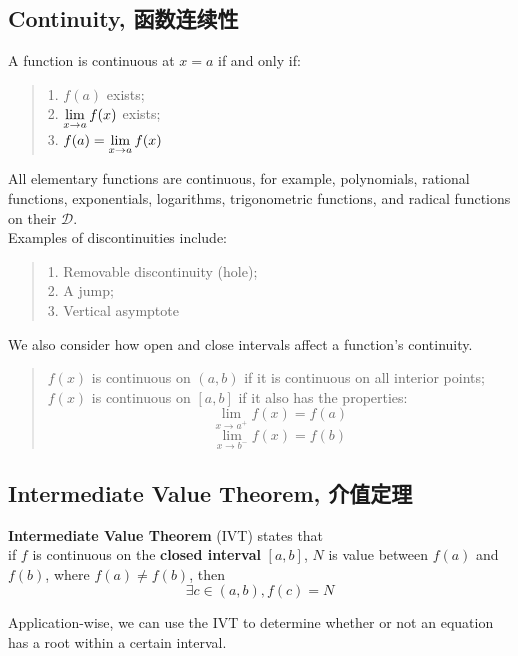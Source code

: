 \subsection{Continuity, 函数连续性}
A function is continuous at $x=a$ if and only if:
\begin{quote}
    1. $f(a)$ exists; \\
    2. $\displaystyle \lim_{x \to a} f(x)$ exists; \\
    3. $f(a) = \displaystyle \lim_{x \to a} f(x)$
\end{quote}
All elementary functions are continuous, for example, polynomials, rational functions, exponentials, logarithms, trigonometric functions, and radical functions on their $\mathscr{D}$. \\
Examples of discontinuities include:
\begin{quote}
    1. Removable discontinuity (hole); \\
    2. A jump; \\
    3. Vertical asymptote
\end{quote}
We also consider how open and close intervals affect a function's continuity.
\begin{quote}
    $f(x)$ is continuous on $(a, b)$ if it is continuous on all interior points; \\
    $f(x)$ is continuous on $[a, b]$ if it also has the properties:
    $$\lim_{x \to a^+} f(x) = f(a)$$
    $$\lim_{x \to b^-} f(x) = f(b)$$
\end{quote}

\subsection{Intermediate Value Theorem, 介值定理}
\begin{theorem}
    \textbf{Intermediate Value Theorem} (IVT) states that \\
    if $f$ is continuous on the \textbf{closed interval} $[a, b]$, $N$ is value between $f(a)$ and $f(b)$, where $f(a) \ne f(b)$, then
    $$\exists c \in (a, b), f(c) = N$$
\end{theorem}
Application-wise, we can use the IVT to determine whether or not an equation has a root within a certain interval.

